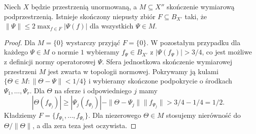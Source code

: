 \begin{lemat}
\label{lem:finite-norming26}
Niech $X$ będzie przestrzenią unormowaną,
a $M\subseteq X''$ skończenie wymiarową podprzestrzenią.
Istnieje skończony niepusty zbiór $F\subseteq B_{X'}$ taki, że
$\|\Psi\|\le 2\max_{f\in F}|\Psi(f)|$ dla wszystkich $\Psi\in M$.
\end{lemat}
\begin{proof}
Dla $M=\{0\}$ wystarczy przyjąć $F=\{0\}$.
W pozostałym przypadku dla każdego $\Psi\in M$ o normie $1$
wybieramy $f_\Psi\in B_{X'}$ z
$|\Psi(f_\Psi)|>3/4$, co jest możliwe z definicji
normy operatorowej $\Psi$. Sfera jednostkowa
skończenie wymiarowej przestrzeni $M$ jest zwarta
w topologii normowej.
Pokrywamy ją kulami $\{\Theta\in M:\|\Theta-\Psi\|<1/4\}$
i wybieramy skończone podpokrycie o środkach
$\Psi_1,\ldots,\Psi_r$. Dla $\Theta$ na sferze i odpowiedniego
$j$ mamy
\[
 |\Theta(f_{\Psi_j})|
 \ge|\Psi_j(f_{\Psi_j})|-\|\Theta-\Psi_j\|\|f_{\Psi_j}\|
 >3/4-1/4=1/2.
\]
Kładziemy $F=\{f_{\Psi_1},\ldots,f_{\Psi_r}\}$.
Dla niezerowego $\Theta\in M$ stosujemy nierówność
do $\Theta/\|\Theta\|$, a dla zera teza jest oczywista.
\end{proof}

